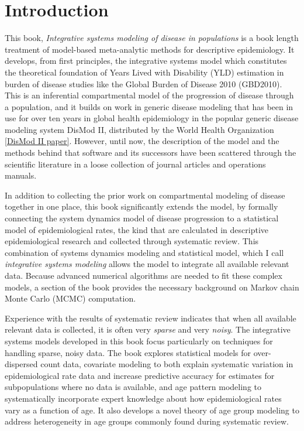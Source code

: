 \section{Introduction}
This book, \emph{Integrative systems modeling of disease in
  populations} is a book length treatment of model-based meta-analytic
methods for descriptive epidemiology.  It develops, from first
principles, the integrative systems model which constitutes the
theoretical foundation of Years Lived with Disability (YLD) estimation
in burden of disease studies like the Global Burden of Disease 2010
(GBD2010).  This is an inferential compartmental model of the
progression of disease through a population, and it builds on work in
generic disease modeling that has been in use for over ten years in
global health epidemiology in the popular generic disease modeling
system DisMod II, distributed by the World Health Organization
\ref{DisMod II paper}.  However, until now, the description of the
model and the methods behind that software and its successors have
been scattered through the scientific literature in a loose collection
of journal articles and operations manuals.

In addition to collecting the prior work on compartmental modeling of
disease together in one place, this book significantly extends the
model, by formally connecting the system dynamics model of disease
progression to a statistical model of epidemiological rates, the kind
that are calculated in descriptive epidemiological research and
collected through systematic review.  This combination of systems
dynamics modeling and statistical model, which I call
\emph{integrative systems modeling} allows the model to integrate all
available relevant data.  Because advanced numerical algorithms are
needed to fit these complex models, a section of the book provides the
necessary background on Markov chain Monte Carlo (MCMC) computation.

Experience with the results of systematic review indicates that when
all available relevant data is collected, it is often very
\emph{sparse} and very \emph{noisy}.  The integrative systems models
developed in this book focus particularly on techniques for handling
sparse, noisy data.  The book explores statistical models for
over-dispersed count data, covariate modeling to both explain
systematic variation in epidemiological rate data and increase
predictive accuracy for estimates for subpopulations where no data is
available, and age pattern modeling to systematically incorporate
expert knowledge about how epidemiological rates vary as a function of
age.  It also develops a novel theory of age group modeling to address
heterogeneity in age groups commonly found during systematic review.

